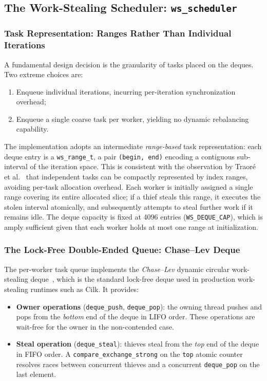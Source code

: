 \documentclass[11pt,english]{article}
\begin{document}
\subsection{The Work-Stealing Scheduler: \texttt{ws\_scheduler}}
 
\subsubsection{Task Representation: Ranges Rather Than Individual Iterations}
 
A fundamental design decision is the granularity of tasks placed on the deques. Two extreme choices are:
\begin{enumerate}
    \item Enqueue individual iterations, incurring per-iteration synchronization overhead;
    \item Enqueue a single coarse task per worker, yielding no dynamic rebalancing capability.
\end{enumerate}
 
The implementation adopts an intermediate \emph{range-based} task representation: each deque entry is a \texttt{ws\_range\_t}, a pair \texttt{(begin, end)} encoding a contiguous sub-interval of the iteration space. This is consistent with the observation by Traor\'e et al.~\cite[Ref.~56]{yanghe2018survey} that independent tasks can be compactly represented by index ranges, avoiding per-task allocation overhead. Each worker is initially assigned a single range covering its entire allocated slice; if a thief steals this range, it executes the stolen interval atomically, and subsequently attempts to steal further work if it remains idle. The deque capacity is fixed at 4096 entries (\texttt{WS\_DEQUE\_CAP}), which is amply sufficient given that each worker holds at most one range at initialization.
 
\subsubsection{The Lock-Free Double-Ended Queue: Chase--Lev Deque}
 
The per-worker task queue implements the \emph{Chase--Lev} dynamic circular work-stealing deque~\cite{chaselev2005deque}, which is the standard lock-free deque used in production work-stealing runtimes such as Cilk. It provides:
 
\begin{itemize}
    \item \textbf{Owner operations} (\texttt{deque\_push}, \texttt{deque\_pop}): the owning thread pushes and pops from the \emph{bottom} end of the deque in LIFO order. These operations are wait-free for the owner in the non-contended case.
    \item \textbf{Steal operation} (\texttt{deque\_steal}): thieves steal from the \emph{top} end of the deque in FIFO order. A \texttt{compare\_exchange\_strong} on the \texttt{top} atomic counter resolves races between concurrent thieves and a concurrent \texttt{deque\_pop} on the last element.
\end{itemize}
 
\end{document}

